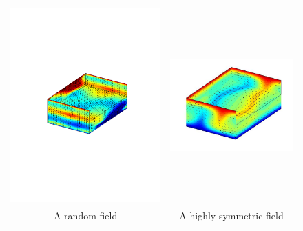 \documentclass[10pt]{beamer}
\begin{document}
\begin{frame}
\begin{figure}
\begin{tabular}{cc}
\includegraphics[scale=0.2]{Data/randomfield} & \includegraphics[scale=0.2]{Data/p85-47}\\
A random field & A highly symmetric field
\end{tabular}
\end{figure}
\end{frame}
\end{document}

